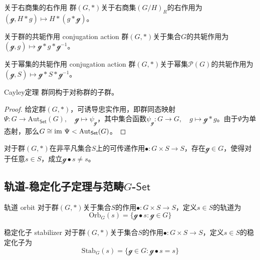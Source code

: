 \begin{definition}{关于右商集的右作用}
	群$(G,*)$关于右商集$(G/H)_R$的右作用为$(\mathcal{g},H*g)\mapsto H*(g*\mathcal{g})$。
\end{definition}

\begin{definition}{关于群的共轭作用 conjugation action}
	群$(G,*)$关于集合$G$的共轭作用为$(\mathcal{g},g)\mapsto \mathcal{g}*g*\mathcal{g}^{-1}$。
\end{definition}

\begin{definition}{关于幂集的共轭作用 conjugation action}
	群$(G,*)$关于幂集$\mathscr{P}(G)$的共轭作用为$(\mathcal{g},S)\mapsto \mathcal{g}*S*\mathcal{g}^{-1}$。
\end{definition}

\begin{theorem}{Cayley定理}
	群同构于对称群的子群。
\end{theorem}

\begin{proof}
	 给定群$(G,*)$，可诱导忠实作用，即群同态映射$\Psi:G\to \mathrm{Aut}_{\mathsf{Set}}(G),\quad \mathcal{g}\mapsto \psi_{\mathcal{g}}$，其中集合函数$\psi_{\mathcal{g}}:G\to G,\quad g\mapsto \mathcal{g}* g$。由于$\Psi$为单态射，那么$G\cong \text{im } \Psi< \mathrm{Aut}_{\mathsf{Set}}(G)$。
\end{proof}

\begin{proposition}
	对于群$(G,*)$在非平凡集合$S$上的可传递作用$\bullet:G\times S\to S$，存在$\mathcal{g}\in G$，使得对于任意$s\in S$，成立$\mathcal{g}\bullet s\ne s$。
\end{proposition}

\subsection{轨道-稳定化子定理与范畴$G$-$\mathsf{Set}$}

\begin{definition}{轨道 orbit}
	对于群$(G,*)$关于集合$S$的作用$\bullet:G\times S\to S$，定义$s\in S$的轨道为
	$$
	\mathrm{Orb}_G(s)=\{ \mathcal{g}\bullet s:\mathcal{g}\in G \}
	$$
\end{definition}

\begin{definition}{稳定化子 stabilizer}
	对于群$(G,*)$关于集合$S$的作用$\bullet:G\times S\to S$，定义$s\in S$的稳定化子为
	$$
	\mathrm{Stab}_G(s)=\{ \mathcal{g}\in G:\mathcal{g}\bullet s=s \}
	$$
\end{definition}

